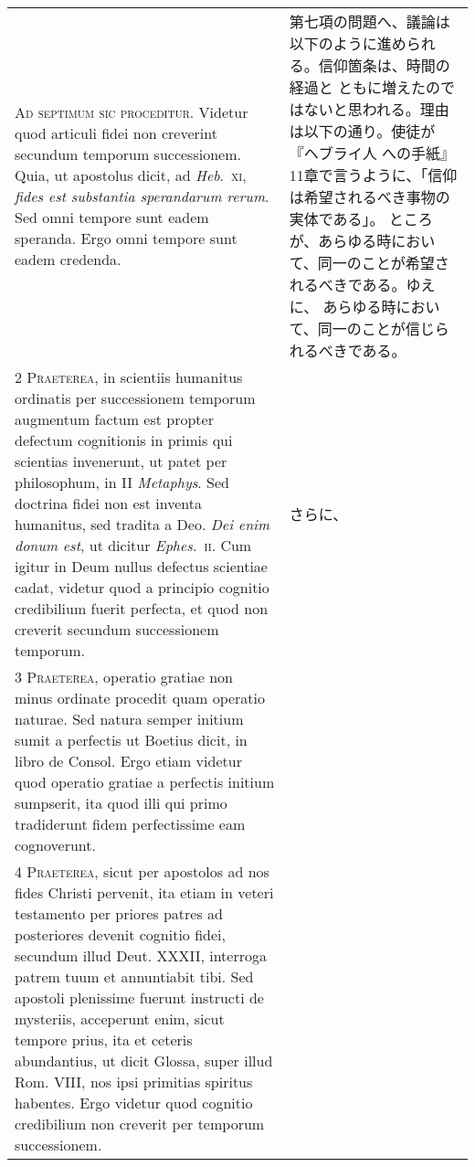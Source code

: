 \documentclass[10pt]{jsarticle} %
\begin{document}
\begin{longtable}{p{21em}p{21em}}

{\huge A}{\scshape d septimum sic proceditur}. Videtur
quod articuli fidei non creverint secundum temporum successionem. Quia,
ut apostolus dicit, ad {\itshape Heb}.~{\scshape xi}, {\itshape fides est substantia sperandarum
rerum}. Sed omni tempore sunt eadem speranda. Ergo omni tempore sunt
eadem credenda.

&

第七項の問題へ、議論は以下のように進められる。信仰箇条は、時間の経過と
ともに増えたのではないと思われる。理由は以下の通り。使徒が『ヘブライ人
への手紙』11章で言うように、「信仰は希望されるべき事物の実体である」。
ところが、あらゆる時において、同一のことが希望されるべきである。ゆえに、
あらゆる時において、同一のことが信じられるべきである。


\\


{\scshape 2 Praeterea}, in scientiis humanitus ordinatis per
successionem temporum augmentum factum est propter defectum cognitionis
in primis qui scientias invenerunt, ut patet per philosophum, in II
{\itshape Metaphys}. Sed doctrina fidei non est inventa humanitus, sed
tradita a Deo. {\itshape Dei enim donum est}, ut dicitur {\itshape
Ephes}.~{\scshape ii}. Cum igitur in Deum nullus defectus scientiae
cadat, videtur quod a principio cognitio credibilium fuerit perfecta, et
quod non creverit secundum successionem temporum.


&


さらに、

\\


{\scshape 3 Praeterea}, operatio gratiae non minus
ordinate procedit quam operatio naturae. Sed natura semper initium sumit
a perfectis ut Boetius dicit, in libro de Consol. Ergo etiam videtur
quod operatio gratiae a perfectis initium sumpserit, ita quod illi qui
primo tradiderunt fidem perfectissime eam cognoverunt.

&


\\


{\scshape 4 Praeterea}, sicut per apostolos ad nos
fides Christi pervenit, ita etiam in veteri testamento per priores
patres ad posteriores devenit cognitio fidei, secundum illud
Deut. XXXII, interroga patrem tuum et annuntiabit tibi. Sed apostoli
plenissime fuerunt instructi de mysteriis, acceperunt enim, sicut
tempore prius, ita et ceteris abundantius, ut dicit Glossa, super illud
Rom. VIII, nos ipsi primitias spiritus habentes. Ergo videtur quod
cognitio credibilium non creverit per temporum successionem.


\end{longtable}
\end{document}
